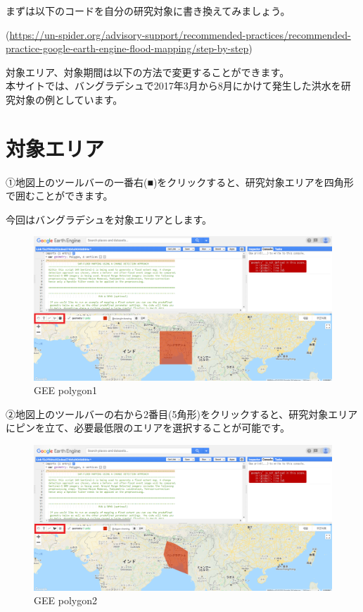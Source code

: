 \documentclass[
]{book}
\begin{document}
まずは以下のコードを自分の研究対象に書き換えてみましょう。

(\url{https://un-spider.org/advisory-support/recommended-practices/recommended-practice-google-earth-engine-flood-mapping/step-by-step})

対象エリア、対象期間は以下の方法で変更することができます。\\
本サイトでは、バングラデシュで2017年3月から8月にかけて発生した洪水を研究対象の例としています。

\hypertarget{ux5bfeux8c61ux30a8ux30eaux30a2}{%
\section{対象エリア}\label{ux5bfeux8c61ux30a8ux30eaux30a2}}

①地図上のツールバーの一番右(■)をクリックすると、研究対象エリアを四角形で囲むことができます。

今回はバングラデシュを対象エリアとします。

\begin{figure}
\centering
\includegraphics{images/geepolygon1.png}
\caption{GEE polygon1}
\end{figure}

②地図上のツールバーの右から2番目(5角形)をクリックすると、研究対象エリアにピンを立て、必要最低限のエリアを選択することが可能です。　　

\begin{figure}
\centering
\includegraphics{images/geepolygon2.png}
\caption{GEE polygon2}
\end{figure}
\end{document}
